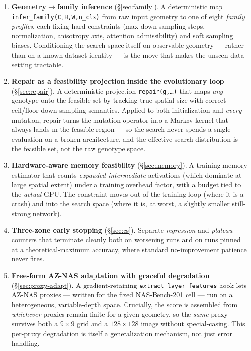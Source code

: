 \documentclass[10pt,twocolumn]{article}
\newcommand{\code}[1]{\texttt{\small #1}}
\begin{document}
\begin{enumerate}\itemsep3pt
\item \textbf{Geometry$\rightarrow$family inference} (\S\ref{sec:family}). A
  deterministic map \code{infer\_family(C,H,W,n\_cls)} from raw input geometry
  to one of eight \emph{family profiles}, each fixing hard constraints (max
  down-sampling steps, normalization, anisotropy axis, attention
  admissibility) and soft sampling biases. Conditioning the search space itself
  on observable geometry --- rather than on a known dataset identity --- is the
  move that makes the unseen-data setting tractable.

\item \textbf{Repair as a feasibility projection inside the evolutionary loop}
  (\S\ref{sec:repair}). A deterministic projection \code{repair(g,\dots)} that
  maps \emph{any} genotype onto the feasible set by tracking true spatial size
  with correct ceil/floor down-sampling semantics. Applied to both
  initialization and \emph{every} mutation, repair turns the mutation operator
  into a Markov kernel that always lands in the feasible region --- so the
  search never spends a single evaluation on a broken architecture, and the
  effective search distribution is the feasible set, not the raw genotype
  space.

\item \textbf{Hardware-aware memory feasibility} (\S\ref{sec:memory}). A
  training-memory estimator that counts \emph{expanded intermediate}
  activations (which dominate at large spatial extent) under a training
  overhead factor, with a budget tied to the \emph{actual} GPU. The constraint
  moves out of the training loop (where it is a crash) and into the search
  space (where it is, at worst, a slightly smaller still-strong network).

\item \textbf{Three-zone early stopping} (\S\ref{sec:es}). Separate
  \emph{regression} and \emph{plateau} counters that terminate cleanly both on
  worsening runs and on runs pinned at a theoretical-maximum accuracy, where
  standard no-improvement patience never fires.

\item \textbf{Free-form AZ-NAS adaptation with graceful degradation}
  (\S\ref{sec:proxy-adapt}). A gradient-retaining \code{extract\_layer\_features}
  hook lets AZ-NAS proxies --- written for the fixed NAS-Bench-201 cell --- run
  on a heterogeneous, variable-depth space. Crucially, the score is assembled
  from \emph{whichever} proxies remain finite for a given geometry, so the
  \emph{same} proxy survives both a $9{\times}9$ grid and a
  $128{\times}128$ image without special-casing. This per-proxy degradation is
  itself a generalization mechanism, not just error handling.
\end{enumerate}
\end{document}
